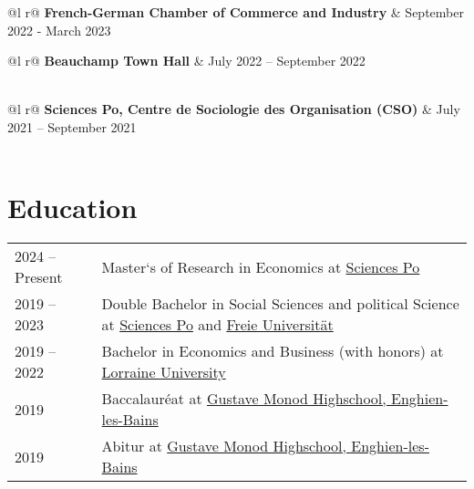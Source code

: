 \documentclass[a4paper,12pt]{article}
\begin{document}
\begin{tabularx}{\linewidth}{ @{}l r@{} }
\textbf{French-German Chamber of Commerce and Industry} & \hfill September 2022 - March 2023 \\[3.75pt]
\end{tabularx}

\begin{tabularx}{\linewidth}{ @{}l r@{} }
\textbf{Beauchamp Town Hall} & \hfill July 2022 – September 2022 \\[3.75pt]
  \\
\end{tabularx}

\begin{tabularx}{\linewidth}{ @{}l r@{} }
\textbf{Sciences Po, Centre de Sociologie des Organisation (CSO)} & \hfill July 2021 – September 2021 \\[3.75pt]
  \\
\end{tabularx}

\section{Education}
\begin{tabularx}{\linewidth}{@{}l X@{}}	

2024 – Present & Master`s of Research in Economics at \href{https://www.sciencespo.fr/en/}{Sciences Po} \\ 

2019 – 2023 & Double Bachelor in Social Sciences and political Science at \href{https://www.sciencespo.fr/en/}{Sciences Po} and \href{https://www.fu-berlin.de/en/index.html}{Freie Universität}\\

2019 – 2022 & Bachelor in Economics and Business (with honors) at \href{https://www.univ-lorraine.fr/en/}{Lorraine University}\\

2019 & Baccalauréat at \href{https://www.lyc-polyvalent-monod-enghien.fr/}{Gustave Monod Highschool, Enghien-les-Bains} \hfill \\

2019 & Abitur at \href{https://www.lyc-polyvalent-monod-enghien.fr/}{Gustave Monod Highschool, Enghien-les-Bains} \hfill \\

\end{tabularx}
\end{document}
